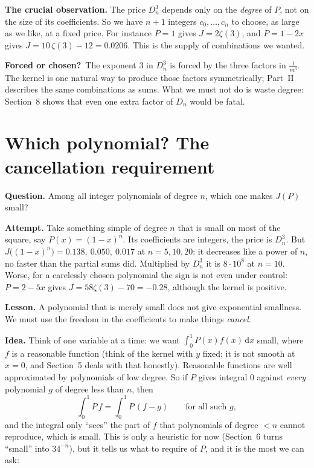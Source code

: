 \documentclass[11pt]{article}
\newcommand{\dd}{\,\mathrm d}
\theoremstyle{remark}
\newcommand{\q}[1]{\medskip\noindent\textbf{#1}}
\newcommand{\forced}{\medskip\noindent\textbf{Forced or chosen?}\ }
\begin{document}
\q{The crucial observation.} The price $D_n^3$ depends only on the \emph{degree} of $P$, not on the
size of its coefficients. So we have $n+1$ integers $c_0,\dots,c_n$ to choose, as large as we like,
at a fixed price. For instance $P=1$ gives $J=2\zeta(3)$, and $P=1-2x$ gives
$J=10\,\zeta(3)-12=0.0206$. This is the supply of combinations we wanted.

\forced The exponent $3$ in $D_n^3$ is forced by the three factors in $\frac1{m^3}$. The kernel
is one natural way to produce those factors symmetrically; Part~II describes the same combinations
as sums. What we must not do is waste degree: Section~8 shows that even one extra
factor of $D_n$ would be fatal.

\section{Which polynomial? The cancellation requirement}

\q{Question.} Among all integer polynomials of degree $n$, which one makes $J(P)$ small?

\q{Attempt.} Take something simple of degree $n$ that is small on most of the square, say
$P(x)=(1-x)^n$. Its coefficients are integers, the price is $D_n^3$. But
$J\bigl((1-x)^n\bigr)=0.138,\ 0.050,\ 0.017$ at $n=5,10,20$: it decreases like a power of $n$, no
faster than the partial sums did. Multiplied by $D_n^3$ it is $8\cdot10^{8}$ at $n=10$. Worse, for
a carelessly chosen polynomial the sign is not even under control: $P=2-5x$ gives
$J=58\zeta(3)-70=-0.28$, although the kernel is positive.

\q{Lesson.} A polynomial that is merely small does not give exponential smallness. We must use the
freedom in the coefficients to make things \emph{cancel}.

\q{Idea.} Think of one variable at a time: we want $\int_0^1P(x)f(x)\dd x$ small, where $f$ is a
reasonable function (think of the kernel with $y$ fixed; it is not smooth at $x=0$, and Section~5
deals with that honestly). Reasonable functions are well approximated by polynomials of low degree. So if $P$ gives integral $0$ against \emph{every}
polynomial $g$ of degree less than $n$, then
\[
\int_0^1P\,f=\int_0^1P\,(f-g)\qquad\text{for all such }g,
\]
and the integral only ``sees'' the part of $f$ that polynomials of degree $<n$ cannot reproduce,
which is small. This is only a heuristic for now (Section~6 turns ``small'' into $34^{-n}$),
but it tells us what to require of $P$, and it is the most we can ask:
\end{document}
